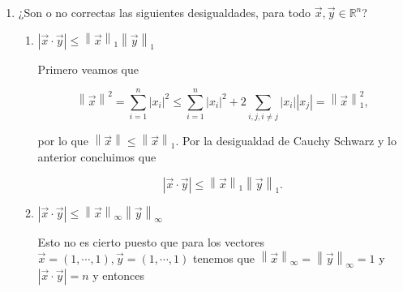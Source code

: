 \documentclass[letterpaper]{article}
\theoremstyle{definition}
\theoremstyle{lemathm}
\theoremstyle{lemathm}
\theoremstyle{lemathm}
\theoremstyle{lemademthm}
\newcommand{\abs}[1]{\left| #1 \right| }
\newcommand{\pars}[1]{\left( #1 \right) }
\newcommand{\inprod}[1]{\left\langle #1 \right\rangle }
\newcommand{\norm}[1]{\left\lVert#1\right\rVert}
\newcommand{\RR}{\mathbb{R}}
\newcommand{\1}{\mathbbm{1}}
\begin{document}
\begin{enumerate}
\begin{enumerate}
			\begin{proof}
				Para $\vec{x} = \pars{1,0,\cdots,0}$ y $\vec{y} = \pars{0,\cdots,0,1}$ tenemos que

				\[\norm{x+y}_{1}^2 + \norm{x-y}_{1}^2 = n^2+n^2 = 2n^2.\]

				pero

				\[2\pars{\norm{x}_{1}^2 + \norm{y}_{1}^2} = 2\pars{n^2+n^2} = 4n^2,\]

				por lo tanto la ley del paralelogramo no se cumple con $\norm{\cdot}_{\infty}$.
			\end{proof}

			\item Probar que $\norm{\vec{x}+\vec{y}}\norm{\vec{x}-\vec{y}}\leq\norm{\vec{x}}^2+\norm{\vec{y}}^2$.
			\begin{proof}
				Por MA-MG, la relación entre producto punto y norma, y linealidad del producto punto concluimos

				\[\norm{\vec{x}+\vec{y}}\norm{\vec{x}-\vec{y}} \leq \frac{\norm{\vec{x}+\vec{y}}^2 + \norm{\vec{x}-\vec{y}}^2}{2} = \frac{\inprod{\vec{x}+\vec{y},\vec{x}+\vec{y}} + \inprod{\vec{x}-\vec{y},\vec{x}-\vec{y}}}{2} =  \norm{\vec{x}}^2+\norm{\vec{y}}^2.\]
			\end{proof}
		\end{enumerate}

		\newpage

		\item ¿Son o no correctas las siguientes desigualdades, para todo $\vec{x},\vec{y}\in\RR^n$?
		
		\begin{enumerate}
			\item $\abs{\vec{x}\cdot\vec{y}} \leq \norm{\vec{x}}_{1}\norm{\vec{y}}_{1}$
			
			Primero veamos que

			\[\norm{\vec{x}}^2 = \sum_{i=1}^n \abs{x_i}^2 \leq \sum_{i=1}^n \abs{x_i}^2 + 2\sum_{i,j,i\neq j}\abs{x_i}\abs{x_j} = \norm{\vec{x}}_{1}^2,\]

			por lo 	que $\norm{\vec{x}} \leq \norm{\vec{x}}_{1}$. Por la desigualdad de Cauchy Schwarz y lo anterior concluimos que
			
			\[\abs{\vec{x}\cdot\vec{y}} \leq \norm{\vec{x}}_{1}\norm{\vec{y}}_1.\]

			\item $\abs{\vec{x}\cdot\vec{y}} \leq \norm{\vec{x}}_{\infty}\norm{\vec{y}}_{\infty}$
			
			Esto no es cierto puesto que para los vectores $\vec{x} = \pars{1,\cdots,1},\vec{y}=\pars{1,\cdots,1}$ tenemos que $\norm{\vec{x}}_{\infty} = \norm{\vec{y}}_{\infty} = 1$ y $\abs{\vec{x}\cdot\vec{y}} = n$ y entonces


\end{enumerate}
\end{enumerate}
\end{document}
